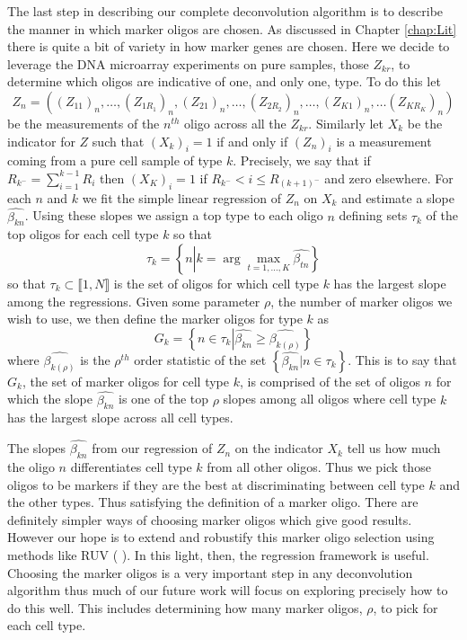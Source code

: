 \documentclass[reqno,12pt,oneside]{report}\usepackage[]{graphicx}\usepackage[]{color}
\renewcommand{\citet}[1]{(\citeauthor{#1} \citeyear{#1})}
\theoremstyle{plain}
\theoremstyle{definition}
\theoremstyle{remark}
\numberwithin{theorem}{chapter}     %
\begin{document}
The last step in describing our complete deconvolution algorithm is to describe the manner in which marker oligos are chosen. As discussed in Chapter \ref{chap:Lit} there is quite a bit of variety in how marker genes are chosen. Here we decide to leverage the DNA microarray experiments on pure samples, those $Z_{kr}$, to determine which oligos are indicative of one, and only one, type. To do this let 
$$
Z_n = ((Z_{11})_n,\ldots,(Z_{1R_1})_n,(Z_{21})_n,\ldots,(Z_{2R_2})_n,\ldots,(Z_{K1})_n,\ldots (Z_{KR_K})_n)
$$
be the measurements of the $n^{th}$ oligo across all the $Z_{kr}$. Similarly let $X_k$ be the indicator for $Z$ such that $(X_k)_i=1$ if and only if $(Z_n)_i$ is a measurement coming from a pure cell sample of type $k$. Precisely, we say that if $R_{k^-} = \sum_{i=1}^{k-1} R_i$ then $(X_K)_i = 1$ if $R_{k^-} < i \leq R_{{(k+1)}^{-}}$ and zero elsewhere. For each $n$ and $k$ we fit the simple linear regression of $Z_n$ on $X_k$ and estimate a slope $\widehat{\beta_{kn}}$. Using these slopes we assign a top type to each oligo $n$ defining sets $\tau_k$ of the top oligos for each cell type $k$ so that 
$$
\tau_k = \left\{n \left| k=\arg\max_{t=1,\ldots,K}\widehat{\beta_{tn}}\right.\right\}
$$
so that $\tau_k\subset \llbracket 1,N \rrbracket$ is the set of oligos for which cell type $k$ has the largest slope among the regressions. 
Given some parameter $\rho$, the number of marker oligos we wish to use, we then define the marker oligos for type $k$ as
$$
G_k = \left\{n \in \tau_k \left|\widehat{\beta_{kn}} \geq \widehat{\beta_{k(\rho)}}\right.\right\}
$$
where $\widehat{\beta_{k(\rho)}}$ is the $\rho^{th}$ order statistic of the set $\left\{\widehat{\beta_{kn}}\left|n\in\tau_k\right.\right\}$. This is to say that $G_k$, the set of marker oligos for cell type $k$, is comprised of the set of oligos $n$ for which the slope $\widehat{\beta_{kn}}$ is one of the top $\rho$ slopes among all oligos where cell type $k$ has the largest slope across all cell types. 

The slopes $\widehat{\beta_{kn}}$ from our regression of $Z_n$ on the indicator $X_k$ tell us how much the oligo $n$ differentiates cell type $k$ from all other oligos. Thus we pick those oligos to be markers if they are the best at discriminating between cell type $k$ and the other types. Thus satisfying the definition of a marker oligo. There are definitely simpler ways of choosing marker oligos which give good results. However our hope is to extend and robustify this marker oligo selection using methods like RUV \citet{Gagnon-Bartsch2012}. In this light, then, the regression framework is useful. Choosing the marker oligos is a very important step in any deconvolution algorithm thus much of our future work will focus on exploring precisely how to do this well. This includes determining how many marker oligos, $\rho$, to pick for each cell type. 
\end{document}
